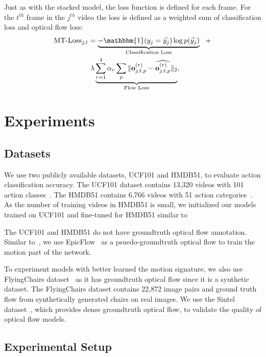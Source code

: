 \documentclass[10pt,twocolumn,letterpaper]{article}
\begin{document}
Just as with the stacked model, the loss function is defined for each frame.
For the $t^{th}$ frame in the $j^{th}$ video the loss is defined as a weighted sum of classification loss and optical flow loss:
\vspace{-1em}
\begin{multline} 
\text{MT-Loss}_{j,t} = \underbrace{-\mathbbm{1}(y_j = \widehat{y_j})\log p(\widehat{y_j})}_{\text{Classification Loss}}~~ +\\
    ~~\lambda \underbrace{ \sum_{r=1}^{4} \alpha_r \sum_{p} \|\mathbf{o}_{j,t,p}^{(r)} - \widehat{\mathbf{o}_{j,t,p}^{(r)}} \|_2 }_{\text{Flow Loss}},
\label{eq:mt_loss}
\end{multline}

\vspace{-2.5em}
 

\section{Experiments}
\label{sec:exp}

\subsection{Datasets}
We use two publicly available datasets, UCF101 and HMDB51, to evaluate action classification accuracy.
The UCF101 dataset contains 13,320 videos with 101 action classes~\cite{ucf101}.
The HMDB51 contains 6,766 videos with 51 action categories~\cite{kuehneHETT11}.
As the number of training videos in HMDB51 is small, we initialized our models trained on UCF101 and fine-tuned for HMDB51 similar to~\cite{simonyanZ14a}

The UCF101 and HMDB51 do not have groundtruth optical flow annotation.
Similar to~\cite{tranbftp16}, we use EpicFlow~\cite{ravaudWHS15} as a psuedo-groundtruth optical flow to train the motion part of the network.

To experiment models with better learned the motion signature, we also use FlyingChairs dataset~\cite{FischerDIHHGSCB15} as it has groundtruth optical flow since it is a synthetic dataset.
The FlyingChairs dataset contains 22,872 image pairs and ground truth flow from synthetically generated chairs on real images.
We use the Sintel dataset~\cite{butlerWSB12}, which provides dense groundtruth optical flow, to validate the quality of optical flow models.


\subsection{Experimental Setup}
\end{document}
